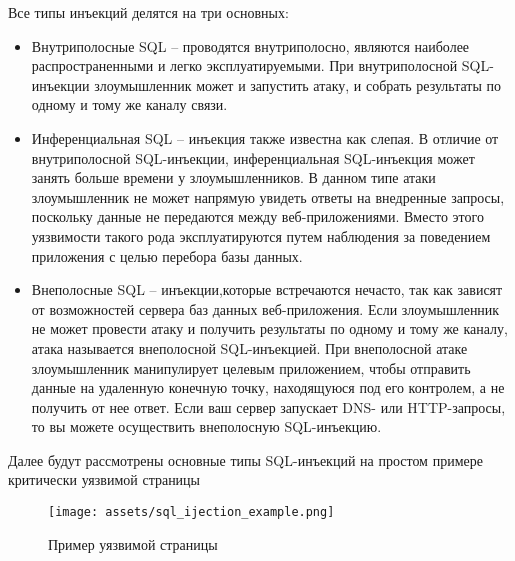 Все типы инъекций делятся на три основных:
\begin{itemize}
	\item Внутриполосные SQL -- проводятся внутриполосно, являются наиболее распространенными и легко эксплуатируемыми. При внутриполосной SQL-инъекции злоумышленник может и запустить атаку, и собрать результаты по одному и тому же каналу связи.
	
	\item Инференциальная SQL -- инъекция также известна как слепая. В отличие от внутриполосной SQL-инъекции, инференциальная SQL-инъекция может занять больше времени у злоумышленников. В  данном типе атаки злоумышленник не может напрямую увидеть ответы на внедренные запросы, поскольку данные не передаются между веб-приложениями. Вместо этого уязвимости такого рода эксплуатируются путем наблюдения за поведением приложения с целью перебора базы данных. 
	
	\item Внеполосные SQL -- инъекции,которые встречаются нечасто, так как зависят от возможностей сервера баз данных веб-приложения. Если злоумышленник не может провести атаку и получить результаты по одному и тому же каналу, атака называется внеполосной SQL-инъекцией. При внеполосной атаке злоумышленник манипулирует целевым приложением, чтобы отправить данные на удаленную конечную точку, находящуюся под его контролем, а не получить от нее ответ. 	Если ваш сервер запускает DNS- или HTTP-запросы, то вы можете осуществить внеполосную SQL-инъекцию. 
\end{itemize}

Далее будут рассмотрены основные типы SQL-инъекций \autocite{proglib, SqlInjection} на простом примере критически уязвимой страницы
\begin{figure}[h]
    \centering
    \texttt{[image: assets/sql\_ijection\_example.png]}
    \caption{Пример уязвимой страницы}
    \label{fig:mesh}
\end{figure}


